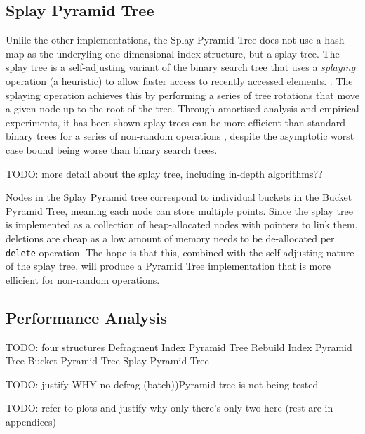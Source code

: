 \subsection{Splay Pyramid Tree}

Unlile the other implementations, the Splay Pyramid Tree does not use a hash map as the underyling one-dimensional index structure, but a splay tree. The splay tree is a self-adjusting variant of the binary search tree that uses a \textit{splaying} operation (a heuristic) to allow faster access to recently accessed elements. \cite{splay-tree}. The splaying operation achieves this by performing a series of tree rotations that move a given node up to the root of the tree. Through amortised analysis and empirical experiments, it has been shown splay trees can be more efficient than standard binary trees for a series of non-random operations \cite{splay-tree, TODO}, despite the asymptotic worst case bound being worse than binary search trees.

TODO: more detail about the splay tree, including in-depth algorithms??

Nodes in the Splay Pyramid tree correspond to individual buckets in the Bucket Pyramid Tree, meaning each node can store multiple points. Since the splay tree is implemented as a collection of heap-allocated nodes with pointers to link them, deletions are cheap as a low amount of memory needs to be de-allocated per \texttt{delete} operation. The hope is that this, combined with the self-adjusting nature of the splay tree, will produce a Pyramid Tree implementation that is more efficient for non-random operations.

\subsection{Performance Analysis}

TODO: four structures
	Defragment Index Pyramid Tree
	Rebuild Index Pyramid Tree
	Bucket Pyramid Tree
	Splay Pyramid Tree

TODO: justify WHY no-defrag (batch))Pyramid tree is not being tested

TODO: refer to plots and justify why only there's only two here (rest are in appendices)


